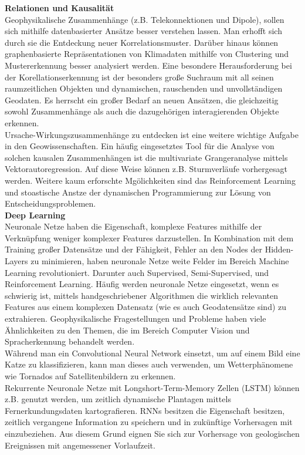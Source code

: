 \documentclass[11pt,fleqn]{book}
\begin{document}
\bigskip
\textbf{Relationen und Kausalität}\\
Geophysikalische Zusammenhänge (z.B. Telekonnektionen und Dipole), sollen sich mithilfe datenbasierter Ansätze besser verstehen lassen. Man erhofft sich durch sie die Entdeckung neuer Korrelationsmuster.
Darüber hinaus können graphenbasierte Repräsentationen von Klimadaten mithilfe von Clustering und Mustererkennung besser analysiert werden.
\bigskip
Eine besondere Herausforderung bei der Korellationserkennung ist der besonders große Suchraum mit all seinen raumzeitlichen Objekten und dynamischen, rauschenden und unvollständigen Geodaten. Es herrscht ein großer Bedarf an neuen Ansätzen, die gleichzeitig sowohl Zusammenhänge als auch die dazugehörigen interagierenden Objekte erkennen.\\
Ursache-Wirkungszusammenhänge zu entdecken ist eine weitere wichtige Aufgabe in den Geowissenschaften. Ein häufig eingesetztes Tool für die Analyse von solchen kausalen Zusammenhängen ist die multivariate Grangeranalyse mittels Vektorautoregression. Auf diese Weise können z.B. Sturmverläufe vorhergesagt werden. Weitere kaum erforschte Mgölichkeiten sind das Reinforcement Learning und stoastische Anstze der dynamischen Programmierung zur Lösung von Entscheidungsproblemen.
\\ \bigskip
\textbf{Deep Learning}\\
Neuronale Netze haben die Eigenschaft, komplexe Features mithilfe der Verknüpfung weniger komplexer Features darzustellen. In Kombination mit dem Training großer Datensätze und der Fähigkeit, Fehler an den Nodes der Hidden-Layers zu minimieren, haben neuronale Netze weite Felder im Bereich Machine Learning revolutioniert. Darunter auch  Supervised, Semi-Supervised, und Reinforcement Learning. Häufig werden neuronale Netze eingesetzt, wenn es schwierig ist, mittels handgeschriebener Algorithmen die wirklich relevanten Features aus einem komplexen Datensatz (wie es auch Geodatensätze sind) zu extrahieren. Geophysikalische Fragestellungen und Probleme haben viele Ähnlichkeiten zu den Themen, die im Bereich Computer Vision und Spracherkennung behandelt werden. \\
\bigskip
Während man ein Convolutional Neural Network einsetzt, um auf einem Bild eine Katze zu klassifizieren, kann man dieses auch verwenden, um Wetterphänomene wie Tornados auf Satellitenbildern zu erkennen. \\ \bigskip
Rekurrente Neuronale Netze mit Longshort-Term-Memory Zellen (LSTM) können z.B. genutzt werden, um zeitlich dynamische Plantagen mittels Fernerkundungsdaten kartografieren. RNNs besitzen die Eigenschaft besitzen, zeitlich vergangene Information zu speichern und in zukünftige Vorhersagen mit einzubeziehen. Aus diesem Grund eignen Sie sich zur Vorhersage von geologischen Ereignissen mit angemessener Vorlaufzeit.\\
\end{document}
